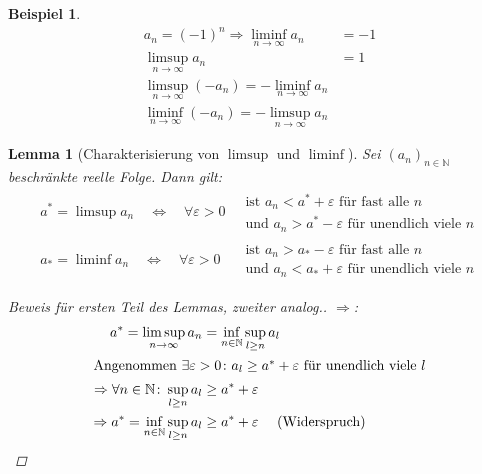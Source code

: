 \documentclass[11pt, twoside, a4paper]{article}
\theoremstyle{plain}
\newtheorem{lemma}[blockelement]{Lemma}
\newtheorem{beispiel}[blockelement]{Beispiel}
\newcommand{\equivalent}[0]{\Leftrightarrow{}}
\newcommand{\impl}[0]{\Rightarrow{}}
\newcommand{\anf}[1]{\glqq{}#1\grqq}
\newcommand{\fromto}{\rightarrow{}}
\newcommand{\naturalnumbers}{\mathbb{N}}
\begin{document}
    \begin{beispiel}
        \begin{align*}
            a_n = (-1)^n \impl \liminf_{n\fromto\infty} a_n &= -1\\
            \limsup_{n\fromto\infty} a_n &= 1\\[10pt]
            \limsup_{n\fromto\infty} (-a_n) = - \liminf_{n\fromto\infty} a_n\\
            \liminf_{n\fromto\infty} (-a_n) = -\limsup_{n\fromto\infty} a_n
        \end{align*}
    \end{beispiel}
    \newpage

    \begin{lemma}[Charakterisierung von $\limsup$ und $\liminf$] %
        \label{lemma:limsup-charak}
        Sei $(a_n)_{n\in\naturalnumbers}$ beschränkte reelle Folge. Dann gilt:
        \begin{align*}
            a^{*} = \limsup a_n\quad\equivalent\quad \forall \varepsilon > 0~
            &
            \begin{array}{l}
                \text{ist } a_n < a^{*} + \varepsilon\text{ für fast alle $n$} \\
                \text{und } a_n > a^{*} -\varepsilon\text{ für unendlich viele $n$}
            \end{array}
            \\[10pt]
            a_{*} = \liminf a_n\quad\equivalent\quad \forall \varepsilon > 0~
            &
            \begin{array}{l}
                \text{ist } a_n > a_{*} - \varepsilon\text{ für fast alle $n$} \\
                \text{und } a_n < a_{*} + \varepsilon\text{ für unendlich viele $n$}
            \end{array}
        \end{align*}
        \begin{proof}[Beweis für ersten Teil des Lemmas, zweiter analog.]
            \anf{$\impl$}:
            \begin{align*}
                a^{*} = \limsup_{n\fromto\infty} a_n &= \inf_{n\in\naturalnumbers} \sup_{l\geq n} a_l\\
                \intertext{Angenommen $\exists \varepsilon > 0\colon a_l \geq a^{*} +\varepsilon$ für unendlich viele $l$}
                \impl \forall n\in\naturalnumbers\colon \sup_{l\geq n} a_l &\geq a^{*} + \varepsilon\\
                \impl a^{*} = \inf_{n\in\naturalnumbers} \sup_{l\geq n} a_l &\geq a^{*} + \varepsilon\quad\text{ (Widerspruch)}

\end{align*}
\end{proof}
\end{lemma}
\end{document}

